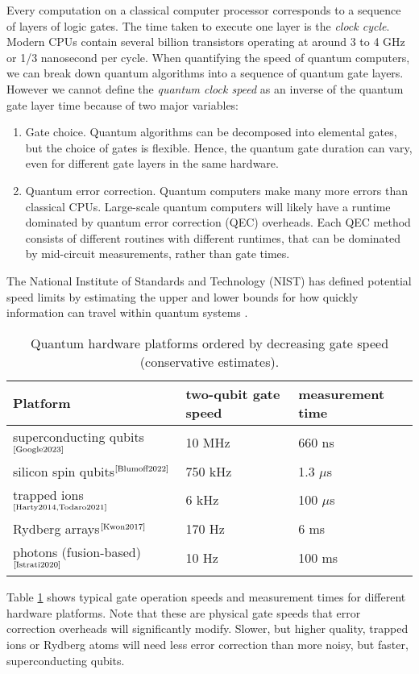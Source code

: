 \documentclass[10pt]{iopart}
\begin{document}
Every computation on a classical computer processor corresponds to a sequence of layers of logic gates. The time taken to execute one layer is the \textit{clock cycle}. Modern CPUs contain several billion transistors operating at around 3 to 4 GHz or 1/3 nanosecond per cycle. When quantifying the speed of quantum computers, we can break down quantum algorithms into a sequence of quantum gate layers. However we cannot define the \textit{quantum clock speed} as an inverse of the quantum gate layer time because of two major variables:
\begin{enumerate}
\item Gate choice. Quantum algorithms can be decomposed into elemental gates, but the choice of gates is flexible. Hence, the quantum gate duration can vary, even for different gate layers in the same hardware.
\item Quantum error correction. Quantum computers make many more errors than classical CPUs. Large-scale quantum computers will likely have a runtime dominated by quantum error correction (QEC) overheads. Each QEC method consists of different routines with different runtimes, that can be dominated by mid-circuit measurements, rather than gate times.
\end{enumerate}
The National Institute of Standards and Technology (NIST) has defined potential speed limits by estimating the upper and lower bounds for how quickly information can travel within quantum systems \cite{FossFeig2015,Jordan2017}. 

\begin{table}[ht!]
\centering
\caption{Quantum hardware platforms ordered by decreasing gate speed (conservative estimates).}
\bgroup
\def\arraystretch{2}
\footnotesize
\begin{tabular}{p{1.2in}p{.8in}p{.9in}}
\textbf{Platform} & \textbf{two-qubit gate speed} & \textbf{measurement time} \\[4pt]
\hline
superconducting qubits$^\text{\cite{Google2023}}$ &
10 MHz & 660 ns
\\
silicon spin qubits$^\text{\cite{Blumoff2022}}$ &
750 kHz & 1.3 $\mu$s
\\
trapped ions$^\text{\cite{Harty2014,Todaro2021}}$ &
6 kHz & 100 $\mu$s
\\
Rydberg arrays$^\text{\cite{Kwon2017}}$ &
170 Hz & 6 ms
\\
\makecell{photons \\ (fusion-based)$^\text{\cite{Istrati2020}}$} &
10 Hz & 100 ms
\\
\hline
\end{tabular}
\egroup
\label{tab:hardware_clock_speed}
\end{table}
%
Table \ref{tab:hardware_clock_speed} shows typical gate operation speeds and measurement times for different hardware platforms.  Note that these are physical gate speeds that error correction overheads will significantly modify.  Slower, but higher quality, trapped ions or Rydberg atoms will need less error correction than more noisy, but faster, superconducting qubits.
\end{document}
